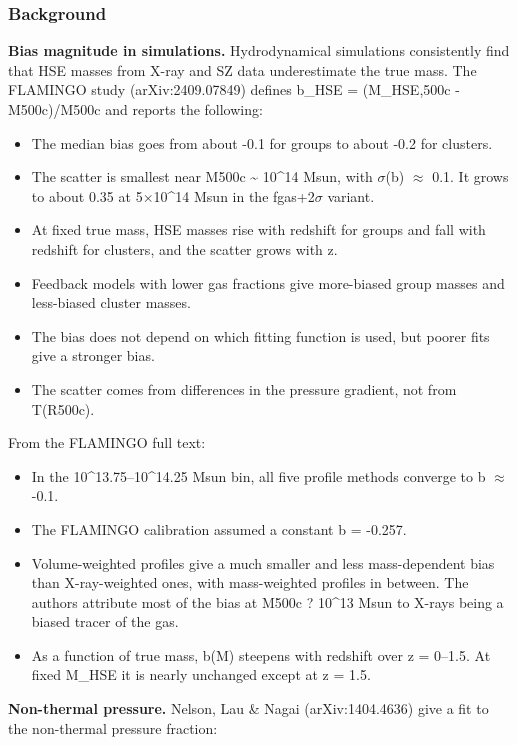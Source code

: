 \documentclass[11pt,a4paper]{article}
\begin{document}
\subsubsection*{Background}
\textbf{Bias magnitude in simulations.} Hydrodynamical simulations consistently find that HSE masses from X-ray and SZ data underestimate the true mass. The FLAMINGO study (arXiv:2409.07849) defines b\_HSE = (M\_HSE,500c - M500c)/M500c and reports the following:

\begin{itemize}
  \item The median bias goes from about -0.1 for groups to about -0.2 for clusters.
  \item The scatter is smallest near M500c \textasciitilde{} 10\textasciicircum{}14 Msun, with $\sigma$(b) $\approx$ 0.1. It grows to about 0.35 at 5$\times$10\textasciicircum{}14 Msun in the fgas+2$\sigma$ variant.
  \item At fixed true mass, HSE masses rise with redshift for groups and fall with redshift for clusters, and the scatter grows with z.
  \item Feedback models with lower gas fractions give more-biased group masses and less-biased cluster masses.
  \item The bias does not depend on which fitting function is used, but poorer fits give a stronger bias.
  \item The scatter comes from differences in the pressure gradient, not from T(R500c).
\end{itemize}
From the FLAMINGO full text:

\begin{itemize}
  \item In the 10\textasciicircum{}13.75--10\textasciicircum{}14.25 Msun bin, all five profile methods converge to b $\approx$ -0.1.
  \item The FLAMINGO calibration assumed a constant b = -0.257.
  \item Volume-weighted profiles give a much smaller and less mass-dependent bias than X-ray-weighted ones, with mass-weighted profiles in between. The authors attribute most of the bias at M500c ? 10\textasciicircum{}13 Msun to X-rays being a biased tracer of the gas.
  \item As a function of true mass, b(M) steepens with redshift over z = 0--1.5. At fixed M\_HSE it is nearly unchanged except at z = 1.5.
\end{itemize}
\textbf{Non-thermal pressure.} Nelson, Lau \& Nagai (arXiv:1404.4636) give a fit to the non-thermal pressure fraction:
\end{document}
